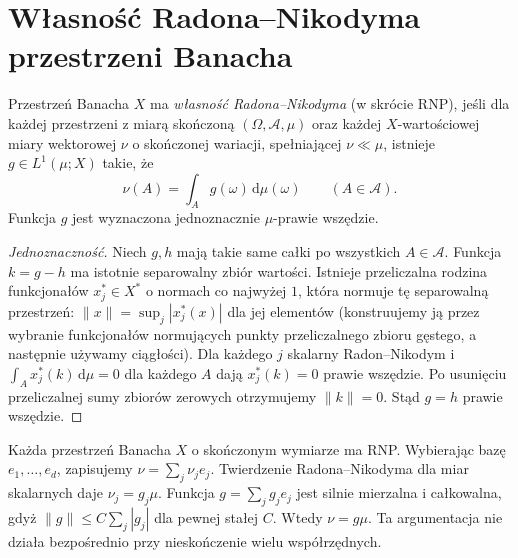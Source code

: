 \section{Własność Radona--Nikodyma przestrzeni Banacha}
\label{sec:rnp-30}
\begin{definicja}
\label{def:RNP-30}
Przestrzeń Banacha $X$ ma \emph{własność Radona--Nikodyma}
(w skrócie RNP), jeśli dla każdej przestrzeni z miarą
skończoną $(\Omega,\mathcal A,\mu)$ oraz każdej
$X$-wartościowej miary wektorowej $\nu$ o skończonej
wariacji, spełniającej $\nu\ll\mu$, istnieje
$g\in L^1(\mu;X)$ takie, że
\begin{equation}\label{eq:RNP-30}
 \nu(A)=\int_Ag(\omega)\,\mathrm d\mu(\omega)
 \qquad(A\in\mathcal A).
\end{equation}
Funkcja $g$ jest wyznaczona jednoznacznie
$\mu$-prawie wszędzie.
\end{definicja}
\begin{proof}[Jednoznaczność]
Niech $g,h$ mają takie same całki po wszystkich
$A\in\mathcal A$. Funkcja $k=g-h$ ma istotnie
separowalny zbiór wartości. Istnieje przeliczalna
rodzina funkcjonałów $x_j^*\in X^*$ o normach co
najwyżej $1$, która normuje tę separowalną przestrzeń:
$\|x\|=\sup_j|x_j^*(x)|$ dla jej elementów
(konstruujemy ją przez wybranie funkcjonałów
normujących punkty przeliczalnego zbioru gęstego,
a następnie używamy ciągłości).
Dla każdego $j$ skalarny Radon--Nikodym i
$\int_A x_j^*(k)\,\mathrm d\mu=0$ dla każdego $A$
dają $x_j^*(k)=0$ prawie wszędzie. Po usunięciu
przeliczalnej sumy zbiorów zerowych otrzymujemy
$\|k\|=0$. Stąd $g=h$ prawie wszędzie.
\end{proof}

\begin{przyklad}
Każda przestrzeń Banacha $X$ o skończonym wymiarze
ma RNP. Wybierając bazę $e_1,\ldots,e_d$,
zapisujemy $\nu=\sum_j\nu_je_j$.
Twierdzenie Radona--Nikodyma dla miar skalarnych
daje $\nu_j=g_j\mu$. Funkcja
$g=\sum_jg_je_j$ jest silnie mierzalna i całkowalna,
gdyż $\|g\|\le C\sum_j|g_j|$ dla pewnej stałej $C$.
Wtedy $\nu=g\mu$. Ta argumentacja nie działa
bezpośrednio przy nieskończenie wielu współrzędnych.
\end{przyklad}

